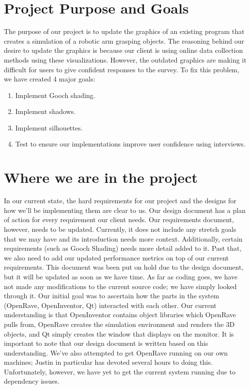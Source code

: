 \documentclass[10pt,journal,compsoc,draftclsnofoot]{IEEEtran}
\begin{document}
\begin{flushleft}

\section{Project Purpose and Goals}
The purpose of our project is to update the graphics of an existing program that creates a simulation of a robotic arm grasping objects.
The reasoning behind our desire to update the graphics is because our client is using online data collection methods using these visualizations.
However, the outdated graphics are making it difficult for users to give confident responses to the survey.
To fix this problem, we have created 4 major goals:
\begin{enumerate}
\item Implement Gooch shading.
\item Implement shadows.
\item Implement silhouettes.
\item Test to ensure our implementations improve user confidence using interviews.
\end{enumerate}

\section{Where we are in the project}
In our current state, the hard requirements for our project and the designs for how we'll be implementing them are clear to us.
Our design document has a plan of action for every requirement our client needs.
Our requirements document, however, needs to be updated.
Currently, it does not include any stretch goals that we may have and its introduction needs more context.
Additionally, certain requirements (such as Gooch Shading) needs more detail added to it.
Past that, we also need to add our updated performance metrics on top of our current requirements.
This document was been put on hold due to the design document, but it will be updated as soon as we have time.
As far as coding goes, we have not made any modifications to the current source code; we have simply looked through it.
Our initial goal was to ascertain how the parts in the system (OpenRave, OpenInventor, Qt) interacted with each other.
Our current understanding is that OpenInventor contains object libraries which OpenRave pulls from, OpenRave creates the simulation environment and renders the 3D objects, and Qt simply creates the window that displays on the monitor.
It is important to note that our design document is written based on this understanding.
We've also attempted to get OpenRave running on our own machines; Justin in particular has devoted several hours to doing this.
Unfortunately, however, we have yet to get the current system running due to dependency issues.


\end{flushleft}
\end{document}
